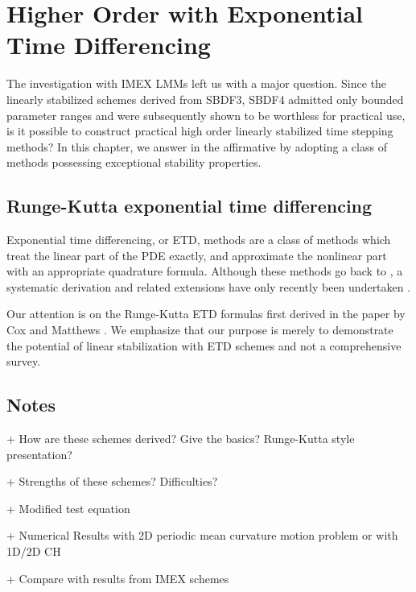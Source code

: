 \chapter{Higher Order with Exponential Time Differencing}
The investigation with IMEX LMMs left us with a major question. Since the linearly stabilized schemes derived from SBDF3, SBDF4 admitted only bounded parameter ranges and were subsequently shown to be worthless for practical use, is it possible to construct practical high order linearly stabilized time stepping methods? In this chapter, we answer in the affirmative by adopting a class of methods possessing  exceptional stability properties. 

\section{Runge-Kutta exponential time differencing }
Exponential time differencing, or ETD, methods are a class of methods which treat the linear part of the PDE exactly, and approximate the nonlinear part with an appropriate quadrature formula. Although these methods go back to \cite{}, a systematic derivation and related extensions have only recently been undertaken \cite{hochbruck2005explicit, hochbruck2005exponential, hochbruck2009exprosenbrock, hochbruck2010expintegrators}.

Our attention is on the Runge-Kutta ETD formulas first derived in the paper by Cox and Matthews \cite{cox2002exponential}. We emphasize that our purpose is merely to demonstrate the potential of linear stabilization with ETD schemes and not a comprehensive survey.

\section{Notes}
+ How are these schemes derived? Give the basics? Runge-Kutta style presentation? 

+ Strengths of these schemes? Difficulties? 

+ Modified test equation

+ Numerical Results with 2D periodic mean curvature motion problem or with 1D/2D CH 

+ Compare with results from IMEX schemes
